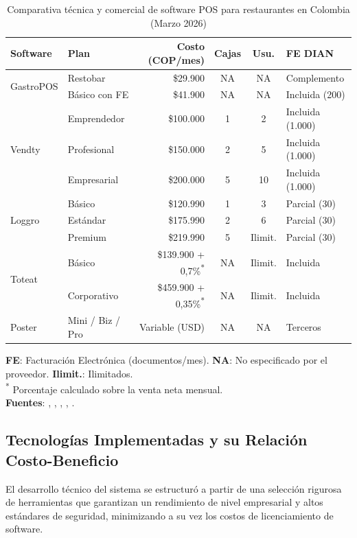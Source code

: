 \begin{table}[h!]
	\centering
	\caption{Comparativa técnica y comercial de software POS para restaurantes en Colombia (Marzo 2026)}
	\label{tab:pos_colombia}
	\small
	\begin{tabularx}{\textwidth}{l X r c c l}
		\toprule
		\textbf{Software} & \textbf{Plan} & \textbf{Costo (COP/mes)} & \textbf{Cajas} & \textbf{Usu.} & \textbf{FE DIAN} \\
		\midrule
		\multirow{2}{*}{GastroPOS} 
		& Restobar & \$29.900 & NA & NA & Complemento \\
		& Básico con FE & \$41.900 & NA & NA & Incluida (200) \\
		\midrule
		\multirow{3}{*}{Vendty} 
		& Emprendedor & \$100.000 & 1 & 2 & Incluida (1.000) \\
		& Profesional & \$150.000 & 2 & 5 & Incluida (1.000) \\
		& Empresarial & \$200.000 & 5 & 10 & Incluida (1.000) \\
		\midrule
		\multirow{3}{*}{Loggro} 
		& Básico & \$120.990 & 1 & 3 & Parcial (30) \\
		& Estándar & \$175.990 & 2 & 6 & Parcial (30) \\
		& Premium & \$219.990 & 5 & Ilimit. & Parcial (30) \\
		\midrule
		\multirow{2}{*}{Toteat} 
		& Básico & \$139.900 + 0,7\%\textsuperscript{*} & NA & Ilimit. & Incluida \\
		& Corporativo & \$459.900 + 0,35\%\textsuperscript{*} & NA & Ilimit. & Incluida \\
		\midrule
		Poster & Mini / Biz / Pro & Variable (USD) & NA & NA & Terceros \\
		\bottomrule
	\end{tabularx}
	\begin{flushleft}
		\footnotesize
		\textbf{FE}: Facturación Electrónica (documentos/mes). \textbf{NA}: No especificado por el proveedor. \textbf{Ilimit.}: Ilimitados. \\
		\textsuperscript{*} Porcentaje calculado sobre la venta neta mensual. \\
		\textbf{Fuentes}: \cite{gastropos}, \cite{vendty}, \cite{loggro_planes}, \cite{toteat_planes}, \cite{comparasoftware_poster}.
	\end{flushleft}
\end{table}


\subsection{Tecnologías Implementadas y su Relación Costo-Beneficio}
El desarrollo técnico del sistema se estructuró a partir de una selección rigurosa de herramientas que garantizan un rendimiento de nivel empresarial y altos estándares de seguridad, minimizando a su vez los costos de licenciamiento de software.

